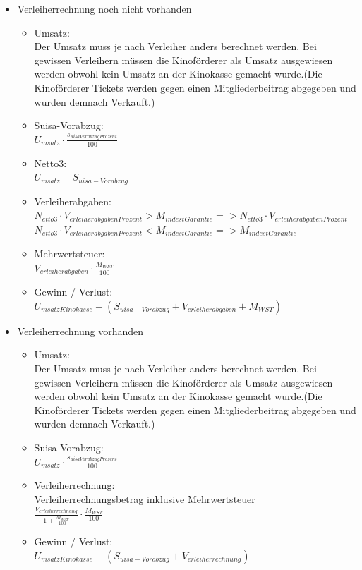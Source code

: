 \documentclass[
]{article}
\providecommand{\tightlist}{%
  \setlength{\itemsep}{0pt}\setlength{\parskip}{0pt}}
\begin{document}
\begin{itemize}
\tightlist
\item
  Verleiherrechnung noch nicht vorhanden

  \begin{itemize}
  \tightlist
  \item
    Umsatz:\\
    Der Umsatz muss je nach Verleiher anders berechnet werden. Bei
    gewissen Verleihern müssen die Kinoförderer als Umsatz ausgewiesen
    werden obwohl kein Umsatz an der Kinokasse gemacht wurde.(Die
    Kinoförderer Tickets werden gegen einen Mitgliederbeitrag abgegeben
    und wurden demnach Verkauft.)
  \item
    Suisa-Vorabzug:\\
    \(U_{msatz}\cdot  \frac {s_{uisaVorabzugProzent}}{100}\)
  \item
    Netto3:\\
    \(U_{msatz}-S_{uisa-Vorabzug}\)
  \item
    Verleiherabgaben:\\
    \(N_{etto3} \cdot V_{erleiherabgabenProzent} > M_{indestGarantie} => N_{etto3} \cdot V_{erleiherabgabenProzent}\)\\
    \(N_{etto3} \cdot V_{erleiherabgabenProzent} < M_{indestGarantie} => M_{indestGarantie}\)
  \item
    Mehrwertsteuer:\\
    \(V_{erleiherabgaben}\cdot \frac{M_{WST}}{100}\)
  \item
    Gewinn / Verlust:\\
    \(U_{msatzKinokasse} - (S_{uisa-Vorabzug} + V_{erleiherabgaben} + M_{WST})\)
  \end{itemize}
\item
  Verleiherrechnung vorhanden

  \begin{itemize}
  \tightlist
  \item
    Umsatz:\\
    Der Umsatz muss je nach Verleiher anders berechnet werden. Bei
    gewissen Verleihern müssen die Kinoförderer als Umsatz ausgewiesen
    werden obwohl kein Umsatz an der Kinokasse gemacht wurde.(Die
    Kinoförderer Tickets werden gegen einen Mitgliederbeitrag abgegeben
    und wurden demnach Verkauft.)
  \item
    Suisa-Vorabzug:\\
    \(U_{msatz}\cdot  \frac {s_{uisaVorabzugProzent}}{100}\)
  \item
    Verleiherrechnung:\\
    Verleiherrechnungsbetrag inklusive Mehrwertsteuer\\
    \(\frac {V_{erleiherrechnung}}{1+\frac{M_{WST}}{100}}\cdot\frac{M_{WST}}{100}\)
  \item
    Gewinn / Verlust:\\
    \(U_{msatzKinokasse} - (S_{uisa-Vorabzug} + V_{erleiherrechnung})\)
  \end{itemize}
\end{itemize}
\end{document}

